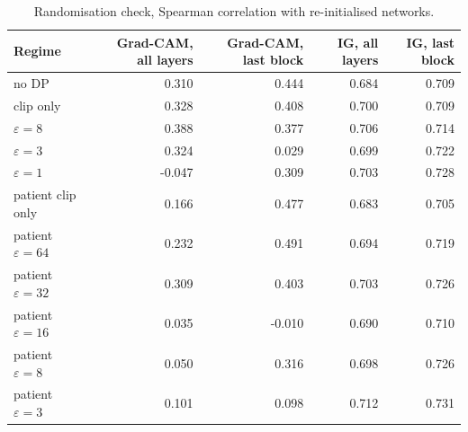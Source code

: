 \begin{table}[H]
\centering\footnotesize
\caption{Randomisation check, Spearman correlation with re-initialised networks.}\label{tab:s_rand}
{\begin{tabular}{lrrrr}
\toprule
Regime & Grad-CAM, all layers & Grad-CAM, last block & IG, all layers & IG, last block \\
\midrule
no DP & 0.310 & 0.444 & 0.684 & 0.709 \\
clip only & 0.328 & 0.408 & 0.700 & 0.709 \\
$\varepsilon=8$ & 0.388 & 0.377 & 0.706 & 0.714 \\
$\varepsilon=3$ & 0.324 & 0.029 & 0.699 & 0.722 \\
$\varepsilon=1$ & -0.047 & 0.309 & 0.703 & 0.728 \\
patient clip only & 0.166 & 0.477 & 0.683 & 0.705 \\
patient $\varepsilon=64$ & 0.232 & 0.491 & 0.694 & 0.719 \\
patient $\varepsilon=32$ & 0.309 & 0.403 & 0.703 & 0.726 \\
patient $\varepsilon=16$ & 0.035 & -0.010 & 0.690 & 0.710 \\
patient $\varepsilon=8$ & 0.050 & 0.316 & 0.698 & 0.726 \\
patient $\varepsilon=3$ & 0.101 & 0.098 & 0.712 & 0.731 \\
\bottomrule
\end{tabular}}
\end{table}

